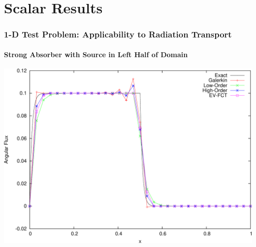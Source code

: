 \documentclass{beamer} \useoutertheme{infolines}
\begin{document}
\section{Scalar Results}
\begin{frame}
\frametitle{1-D Test Problem: Applicability to Radiation Transport}
\framesubtitle{Strong Absorber with Source in Left Half of Domain}

\begin{center}
\includegraphics[height=0.8\textheight]{./figures/solutions_source_FE.pdf}
\end{center}

\end{frame}
\end{document}

